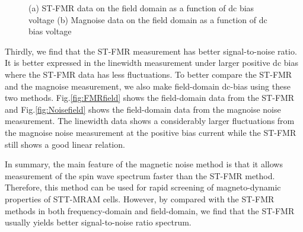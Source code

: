 \begin{figure}[!ht]
\centering
{}
\caption{(a) ST-FMR data on the field domain as a function of dc bias voltage (b) Magnoise data on the field domain as a function of dc bias voltage}
\end{figure}


Thirdly, we find that the ST-FMR measurement has better signal-to-noise ratio. It is better expressed in the linewidth measurement under larger positive dc bias where the ST-FMR data has less fluctuations. To better compare the ST-FMR and the magnoise measurement, we also make field-domain dc-bias using these two methods. Fig.\ref{fig:FMRfield} shows the field-domain data from the ST-FMR and Fig.\ref{fig:Noisefield} shows the field-domain data from the magnoise noise measurement. The linewidth data shows a considerably larger fluctuations from the magnoise noise measurement at the positive bias current while the ST-FMR still shows a good linear relation.

In summary, the main feature of the magnetic noise method is that it allows measurement of the spin wave spectrum faster than the ST-FMR method.  Therefore, this method can be used for rapid screening of magneto-dynamic properties of STT-MRAM cells. However, by compared with the ST-FMR methods in both frequency-domain and field-domain, we find that the ST-FMR usually yields better signal-to-noise ratio spectrum.



